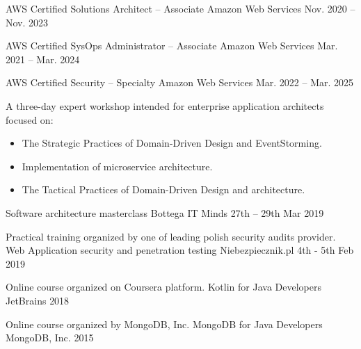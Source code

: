 

\begin{cventries}

  \cventry
    {} %
    {AWS Certified Solutions Architect – Associate} %
    {Amazon Web Services} %
    {Nov. 2020 – Nov. 2023} %
    {}
    
  \cventry
    {} %
    {AWS Certified SysOps Administrator – Associate} %
    {Amazon Web Services} %
    {Mar. 2021 – Mar. 2024} %
    {}
    
   \cventry
    {} %
    {AWS Certified Security – Specialty} %
    {Amazon Web Services} %
    {Mar. 2022 – Mar. 2025} %
    {}

  \cventry
    {A three-day expert workshop intended for enterprise application architects focused on: 
\begin{itemize}
  \item The Strategic Practices of Domain-Driven Design and EventStorming.
  \item Implementation of microservice architecture.
  \item The Tactical Practices of Domain-Driven Design and architecture. 
\end{itemize}\vspace*{-\baselineskip} } %
    {Software architecture masterclass} %
    {Bottega IT Minds} %
    {27th – 29th Mar 2019} %
    {}

  \cventry
    {Practical training organized by one of leading polish security audits provider. } %
    {Web Application security and penetration testing} %
    {Niebezpiecznik.pl} %
    {4th - 5th Feb 2019} %
    {}

      
  \cventry
    {Online course organized on Coursera platform. } %
    {Kotlin for Java Developers} %
    {JetBrains} %
    {2018} %
    {}
    
  \cventry
    {Online course organized by MongoDB, Inc. } %
    {MongoDB for Java Developers} %
    {MongoDB, Inc.} %
    {2015} %
    {}
    
\end{cventries}
